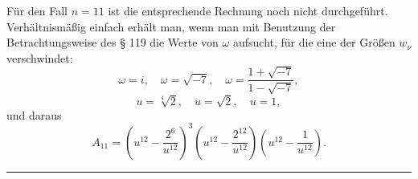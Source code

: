 Für den Fall $n = 11$ ist die entsprechende Rechnung noch
nicht durchgeführt. Verhältnismäßig einfach erhält man, wenn
man mit Benutzung der Betrachtungsweise des § 119 die Werte
von $\omega$ aufsucht, für die eine der Größen $w_\nu$ verschwindet:
\[
\omega = i, \quad \omega = \sqrt{-7}, \quad \omega = \frac{1+\sqrt{-7}}{1-\sqrt{-7}},
\]
\[
u = \sqrt[4]{2}, \quad u = \sqrt{2}, \quad u = 1,
\]
und daraus
\[
A_{11} = \left(u^{12} - \frac{2^6}{u^{12}}\right)^3\left(u^{12}-\frac{2^{12}}{u^{12}}\right)\left(u^{12}-\frac{1}{u^{12}}\right).
\]

\begin{center}\rule{3cm}{0.4pt}\end{center}
